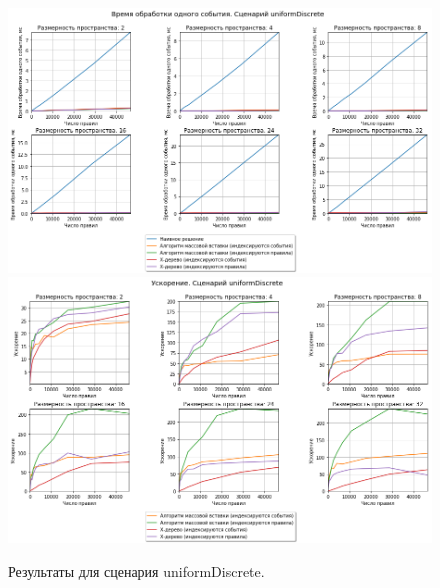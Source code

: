 \documentclass[14pt]{article}
\begin{document}
\begin{figure}[p]
    \centering
    \includegraphics[width=1\textwidth]{images/time/uniformDiscreteTime.png}
    \includegraphics[width=1\textwidth]{images/speedUp/uniformDiscreteSpeedUp.png}
    \caption{Результаты для сценария uniformDiscrete.}
    \label{fig:uniformDiscrete}
\end{figure}
\end{document}
